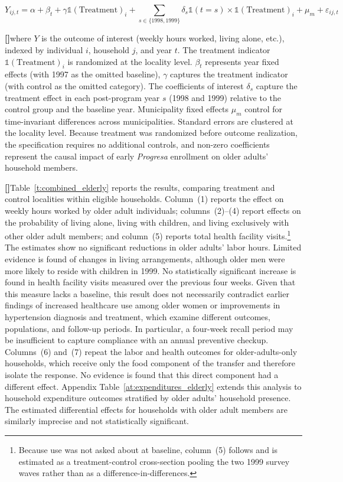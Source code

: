\documentclass[12pt]{article}
\newcounter{paragraphnum}
\newcommand{\p}{\refstepcounter{paragraphnum}\textbf{[\theparagraphnum]}\enspace}
\begin{document}
\begin{equation}\label{eq:exp_did}
Y_{ij,t} = \alpha + \beta_t + \gamma \mathds{1}(\text{Treatment})_i + \sum_{s\in\{1998,1999\}} \delta_s \mathds{1}(t=s)\times\mathds{1}(\text{Treatment})_i + \mu_m + \varepsilon_{ij,t}
\end{equation}

\p where $Y$ is the outcome of interest (weekly hours worked, living alone, etc.), indexed by individual $i$, household $j$, and year $t$. The treatment indicator $\mathds{1}(\text{Treatment})_i$ is randomized at the locality level. $\beta_t$ represents year fixed effects (with 1997 as the omitted baseline), $\gamma$ captures the treatment indicator (with control as the omitted category). The coefficients of interest $\delta_s$ capture the treatment effect in each post-program year $s$ (1998 and 1999) relative to the control group and the baseline year. Municipality fixed effects $\mu_m$ control for time-invariant differences across municipalities. Standard errors are clustered at the locality level. Because treatment was randomized before outcome realization, the specification requires no additional controls, and non-zero coefficients represent the causal impact of early \textit{Progresa} enrollment on older adults' household members.

\p Table~\ref{t:combined_elderly} reports the results, comparing treatment and control localities within eligible households. Column~(1) reports the effect on weekly hours worked by older adult individuals; columns~(2)--(4) report effects on the probability of living alone, living with children, and living exclusively with other older adult members; and column~(5) reports total health facility visits.\footnote{Because use was not asked about at baseline, column~(5) follows \cite{Gertler2000IFPRI} and is estimated as a treatment-control cross-section pooling the two 1999 survey waves rather than as a difference-in-differences.} The estimates show no significant reductions in older adults’ labor hours. Limited evidence is found of changes in living arrangements, although older men were more likely to reside with children in 1999. No statistically significant increase is found in health facility visits measured over the previous four weeks. Given that this measure lacks a baseline, this result does not necessarily contradict earlier findings of increased healthcare use among older women or improvements in hypertension diagnosis and treatment, which examine different outcomes, populations, and follow-up periods. In particular, a four-week recall period may be insufficient to capture compliance with an annual preventive checkup. Columns~(6) and~(7) repeat the labor and health outcomes for older-adults-only households, which receive only the food component of the transfer and therefore isolate the response. No evidence is found that this direct component had a different effect. Appendix Table~\ref{at:expenditures_elderly} extends this analysis to household expenditure outcomes stratified by older adults' household presence. The estimated differential effects for households with older adult members are similarly imprecise and not statistically significant.
\end{document}
